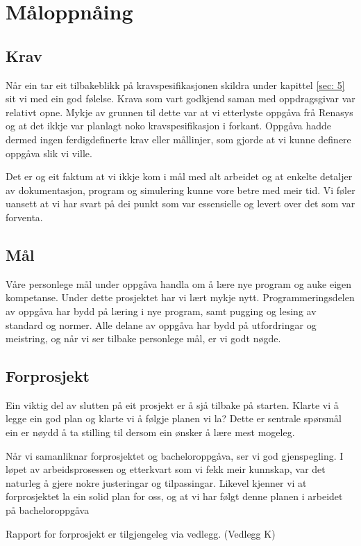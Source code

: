 \section{Måloppnåing}
\thispagestyle{fancy}

\subsection{Krav}
Når ein tar eit tilbakeblikk på kravspesifikasjonen skildra under kapittel \ref{sec: 5} sit vi med ein god følelse.
Krava som vart godkjend saman med oppdragsgivar var relativt opne.
Mykje av grunnen til dette var at vi etterlyste oppgåva frå \gls{Renasys} og at det ikkje var planlagt noko kravspesifikasjon i forkant. \newline
Oppgåva hadde dermed ingen ferdigdefinerte krav eller mållinjer, som gjorde at vi kunne definere oppgåva slik vi ville.

Det er og eit faktum at vi ikkje kom i mål med alt arbeidet og at enkelte detaljer av dokumentasjon, program og simulering
kunne vore betre med meir tid.
Vi føler uansett at vi har svart på dei punkt som var essensielle og levert over det som var forventa.



\subsection{Mål}
Våre personlege mål under oppgåva handla om å lære nye program og auke eigen kompetanse. Under dette prosjektet har vi lært mykje nytt. 
Programmeringsdelen av oppgåva har bydd på læring i nye program, samt pugging og lesing av standard og normer.
Alle delane av oppgåva har bydd på utfordringar og meistring, og når vi ser tilbake personlege mål, er vi godt nøgde.

\subsection{Forprosjekt}
Ein viktig del av slutten på eit prosjekt er å sjå tilbake på starten.
Klarte vi å legge ein god plan og klarte vi å følgje planen vi la?
Dette er sentrale spørsmål ein er nøydd å ta stilling til dersom ein ønsker å lære mest mogeleg.

Når vi samanliknar forprosjektet og bacheloroppgåva, ser vi god gjenspegling. 
I løpet av arbeidsprosessen og etterkvart som vi fekk meir kunnskap, var det naturleg å gjere nokre justeringar og tilpassingar. 
Likevel kjenner vi at forprosjektet la ein solid plan for oss, og at vi har følgt denne planen i arbeidet på bacheloroppgåva

Rapport for forprosjekt er tilgjengeleg via vedlegg. (Vedlegg K)

\newpage
